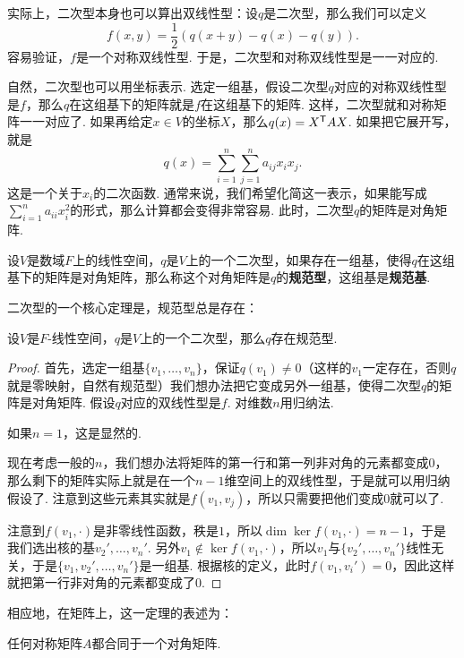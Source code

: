 实际上，二次型本身也可以算出双线性型：设$q$是二次型，那么我们可以定义
\[f(x,y)=\frac{1}{2}(q(x+y)-q(x)-q(y)).\]
容易验证，$f$是一个对称双线性型. 于是，二次型和对称双线性型是一一对应的. 

自然，二次型也可以用坐标表示. 选定一组基，假设二次型$q$对应的对称双线性型是$f$，那么$q$在这组基下的矩阵就是$f$在这组基下的矩阵. 这样，二次型就和对称矩阵一一对应了. 如果再给定$x\in V$的坐标$X$，那么$q(x)=X^{\mathsf{T}} AX$. 如果把它展开写，就是
\[
    q(x)=\sum_{i=1}^n\sum_{j=1}^n a_{ij}x_ix_j.
\]
这是一个关于$x_i$的二次函数. 通常来说，我们希望化简这一表示，如果能写成$\sum_{i=1}^n a_{ii}x_i^2$的形式，那么计算都会变得非常容易. 此时，二次型$q$的矩阵是对角矩阵. 

\begin{definition}[规范型]\label{def:canonical-form}
    设$V$是数域$F$上的线性空间，$q$是$V$上的一个二次型，如果存在一组基，使得$q$在这组基下的矩阵是对角矩阵，那么称这个对角矩阵是$q$的\textbf{规范型}，这组基是\textbf{规范基}. 
\end{definition}

二次型的一个核心定理是，规范型总是存在：
\begin{theorem}\label{thm:quadratic-form-diagonalization}
    设$V$是$F$-线性空间，$q$是$V$上的一个二次型，那么$q$存在规范型. 
\end{theorem}
\begin{proof}
首先，选定一组基$\{v_1,\dots,v_n\}$，保证$q(v_1)\neq 0$（这样的$v_1$一定存在，否则$q$就是零映射，自然有规范型）我们想办法把它变成另外一组基，使得二次型$q$的矩阵是对角矩阵. 假设$q$对应的双线性型是$f$. 对维数$n$用归纳法. 

如果$n=1$，这是显然的. 

现在考虑一般的$n$，我们想办法将矩阵的第一行和第一列非对角的元素都变成$0$，那么剩下的矩阵实际上就是在一个$n-1$维空间上的双线性型，于是就可以用归纳假设了. 注意到这些元素其实就是$f(v_1,v_j)$，所以只需要把他们变成$0$就可以了. 

注意到$f(v_1,\cdot)$是非零线性函数，秩是$1$，所以$\dim\ker f(v_1,\cdot)=n-1$，于是我们选出核的基$v_2',\dots,v_n'$. 另外$v_1\notin\ker f(v_1,\cdot)$，所以$v_1$与$\{v_2',\dots,v_n'\}$线性无关，于是$\{v_1,v_2',\dots,v_n'\}$是一组基. 根据核的定义，此时$f(v_1,v_i')=0$，因此这样就把第一行非对角的元素都变成了$0$. 
\end{proof}

相应地，在矩阵上，这一定理的表述为：
\begin{corollary}\label{cor:quadratic-form-diagonalization}
任何对称矩阵$A$都合同于一个对角矩阵. 
\end{corollary}



